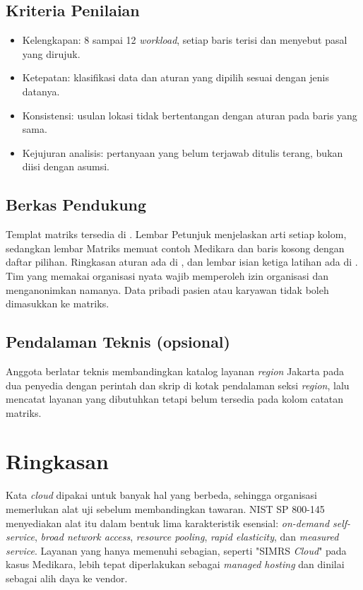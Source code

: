 \subsection*{Kriteria Penilaian}

\begin{itemize}
  \item Kelengkapan: 8 sampai 12 \textit{workload}, setiap baris terisi dan menyebut pasal
        yang dirujuk.
  \item Ketepatan: klasifikasi data dan aturan yang dipilih sesuai dengan jenis datanya.
  \item Konsistensi: usulan lokasi tidak bertentangan dengan aturan pada baris yang sama.
  \item Kejujuran analisis: pertanyaan yang belum terjawab ditulis terang, bukan diisi
        dengan asumsi.
\end{itemize}

\subsection*{Berkas Pendukung}

Templat matriks tersedia di
. Lembar Petunjuk
menjelaskan arti setiap kolom, sedangkan lembar Matriks memuat contoh Medikara dan baris
kosong dengan daftar pilihan. Ringkasan aturan ada di
, dan lembar isian ketiga
latihan ada di . Tim yang memakai
organisasi nyata wajib memperoleh izin organisasi dan menganonimkan namanya. Data pribadi
pasien atau karyawan tidak boleh dimasukkan ke matriks.

\subsection*{Pendalaman Teknis (opsional)}

Anggota berlatar teknis membandingkan katalog layanan \textit{region} Jakarta pada dua
penyedia dengan perintah dan skrip di kotak pendalaman seksi \textit{region}, lalu mencatat
layanan yang dibutuhkan tetapi belum tersedia pada kolom catatan matriks.

\section{Ringkasan}

Kata \textit{cloud} dipakai untuk banyak hal yang berbeda, sehingga organisasi memerlukan
alat uji sebelum membandingkan tawaran. NIST SP 800-145 menyediakan alat itu dalam bentuk
lima karakteristik esensial: \textit{on-demand self-service}, \textit{broad network access},
\textit{resource pooling}, \textit{rapid elasticity}, dan \textit{measured service}. Layanan
yang hanya memenuhi sebagian, seperti "SIMRS \textit{Cloud}" pada kasus Medikara, lebih
tepat diperlakukan sebagai \textit{managed hosting} dan dinilai sebagai alih daya ke vendor.

